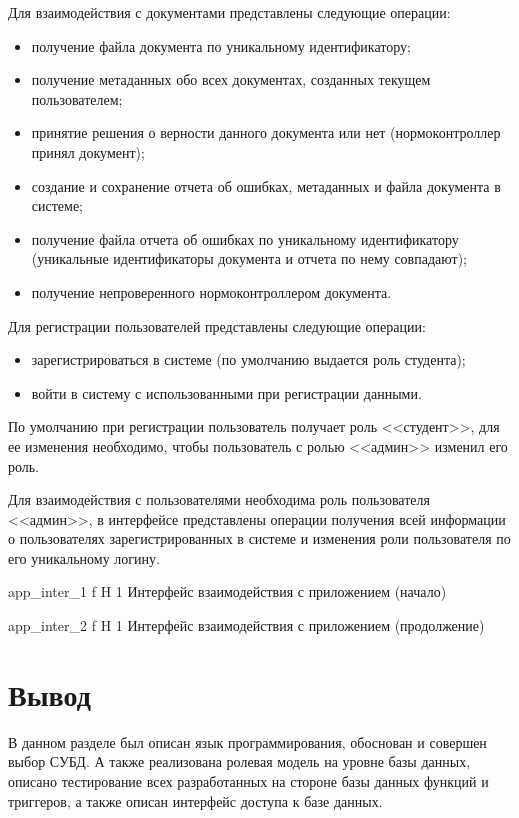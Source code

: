 Для взаимодействия с документами представлены следующие операции:
\begin{itemize}
	\item получение файла документа по уникальному идентификатору;
	\item получение метаданных обо всех документах, созданных текущем
	пользователем;
	\item принятие решения о верности данного документа или нет (нормоконтроллер
	принял документ);
	\item создание и сохранение отчета об ошибках, метаданных и файла документа в
	системе;
	\item получение файла отчета об ошибках по уникальному идентификатору
	(уникальные идентификаторы документа и отчета по нему совпадают);
	\item получение непроверенного нормоконтроллером документа.
\end{itemize}

Для регистрации пользователей представлены следующие операции:
\begin{itemize}
	\item зарегистрироваться в системе (по умолчанию выдается роль студента);
	\item войти в систему с использованными при регистрации данными.
\end{itemize}
По умолчанию при регистрации пользователь получает роль <<студент>>, для ее
изменения необходимо, чтобы пользователь с ролью <<админ>> изменил его роль.

Для взаимодействия с пользователями необходима роль пользователя <<админ>>, в
интерфейсе представлены операции получения всей информации о пользователях зарегистрированных в системе и изменения роли пользователя по его уникальному логину.



{app_inter_1} %
{f} %
{H} %
{1\textwidth} %
{Интерфейс взаимодействия с приложением (начало)} %


{app_inter_2} %
{f} %
{H} %
{1\textwidth} %
{Интерфейс взаимодействия с приложением (продолжение)} %

\section*{Вывод}
В данном разделе был описан язык программирования, обоснован и совершен  выбор
СУБД. А также реализована ролевая модель на уровне базы данных, описано
тестирование всех разработанных на стороне базы данных функций и триггеров, а
также описан интерфейс доступа к базе данных. 












